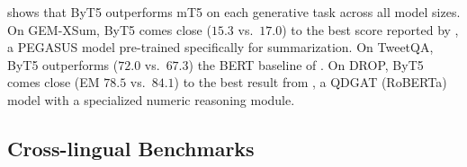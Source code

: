 \documentclass[11pt,a4paper]{article}
\begin{document}
 shows that ByT5 outperforms mT5 on each generative task across all model sizes. On \mbox{GEM-XSum}, ByT5 comes close ($15.3$ vs.~$17.0$) to the best score reported by \citet{gehrmann2021gem}, a PEGASUS model \cite{zhang-2020-pegasus} pre-trained specifically for summarization. On TweetQA, ByT5 outperforms ($72.0$ vs.~$67.3$) the BERT baseline of \citet{xiong-etal-2019-tweetqa}. On DROP, ByT5 comes close (EM $78.5$ vs.~$84.1$) to the best result from \citet{chen2020question}, a QDGAT (RoBERTa) model with a specialized numeric reasoning module.

\subsection{Cross-lingual Benchmarks}

\begin{table}[t!]
\centering
{}
\end{table}
\end{document}
